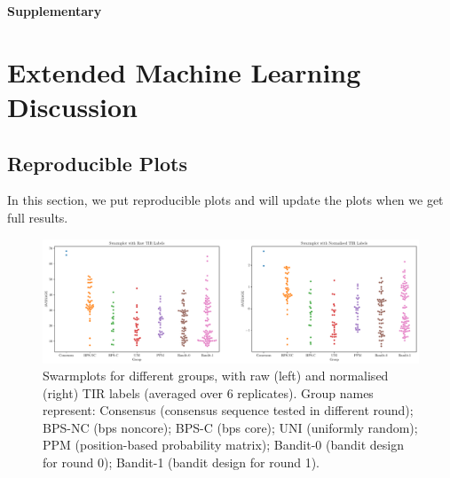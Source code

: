 \textbf{Supplementary}

\section{Extended Machine Learning Discussion}

\subsection{Reproducible Plots}
In this section, we put reproducible plots and will update the plots when we get full results. 

\begin{figure}[h]
    \centering
    \includegraphics[scale = 0.4]{plots/Supplementary/swarmplots.pdf}
    \caption{Swarmplots for different groups, with raw (left) and normalised (right) TIR labels (averaged over 6 replicates). 
    Group names represent: Consensus (consensus sequence tested in different round); BPS-NC (bps noncore); BPS-C (bps core); UNI (uniformly random); PPM (position-based probability matrix); Bandit-0 (bandit design for round 0); Bandit-1 (bandit design for round 1).}
    \label{fig:swarmplots.}
\end{figure}


